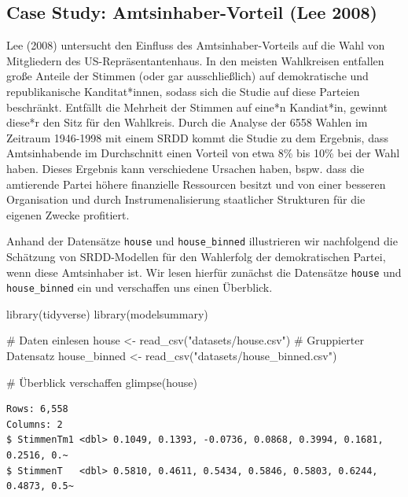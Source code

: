 \documentclass[
  a4paper,
  DIV=11,
  oneside]{scrreprt}
\newenvironment{Shaded}{\begin{snugshade}}{\end{snugshade}}
\newcommand{\CommentTok}[1]{\textcolor[rgb]{0.37,0.37,0.37}{#1}}
\newcommand{\FunctionTok}[1]{\textcolor[rgb]{0.28,0.35,0.67}{#1}}
\newcommand{\NormalTok}[1]{\textcolor[rgb]{0.00,0.23,0.31}{#1}}
\newcommand{\OtherTok}[1]{\textcolor[rgb]{0.00,0.23,0.31}{#1}}
\newcommand{\StringTok}[1]{\textcolor[rgb]{0.13,0.47,0.30}{#1}}
\begin{document}
\subsection{Case Study: Amtsinhaber-Vorteil (Lee
2008)}\label{case-study-amtsinhaber-vorteil-lee2008}

Lee (2008) untersucht den Einfluss des Amtsinhaber-Vorteils auf die Wahl
von Mitgliedern des US-Repräsentantenhaus. In den meisten Wahlkreisen
entfallen große Anteile der Stimmen (oder gar ausschließlich) auf
demokratische und republikanische Kanditat*innen, sodass sich die Studie
auf diese Parteien beschränkt. Entfällt die Mehrheit der Stimmen auf
eine*n Kandiat*in, gewinnt diese*r den Sitz für den Wahlkreis. Durch die
Analyse der 6558 Wahlen im Zeitraum 1946-1998 mit einem SRDD kommt die
Studie zu dem Ergebnis, dass Amtsinhabende im Durchschnitt einen Vorteil
von etwa 8\% bis 10\% bei der Wahl haben. Dieses Ergebnis kann
verschiedene Ursachen haben, bspw. dass die amtierende Partei höhere
finanzielle Ressourcen besitzt und von einer besseren Organisation und
durch Instrumenalisierung staatlicher Strukturen für die eigenen Zwecke
profitiert.

Anhand der Datensätze \texttt{house} und \texttt{house\_binned}
illustrieren wir nachfolgend die Schätzung von SRDD-Modellen für den
Wahlerfolg der demokratischen Partei, wenn diese Amtsinhaber ist. Wir
lesen hierfür zunächst die Datensätze \texttt{house} und
\texttt{house\_binned} ein und verschaffen uns einen Überblick.

\begin{Shaded}
\begin{Highlighting}[]
\FunctionTok{library}\NormalTok{(tidyverse)}
\FunctionTok{library}\NormalTok{(modelsummary)}

\CommentTok{\# Daten einlesen}
\NormalTok{house }\OtherTok{\textless{}{-}} \FunctionTok{read\_csv}\NormalTok{(}\StringTok{"datasets/house.csv"}\NormalTok{)}
\CommentTok{\# Gruppierter Datensatz}
\NormalTok{house\_binned }\OtherTok{\textless{}{-}} \FunctionTok{read\_csv}\NormalTok{(}\StringTok{"datasets/house\_binned.csv"}\NormalTok{)}

\CommentTok{\# Überblick verschaffen}
\FunctionTok{glimpse}\NormalTok{(house)}
\end{Highlighting}
\end{Shaded}

\begin{verbatim}
Rows: 6,558
Columns: 2
$ StimmenTm1 <dbl> 0.1049, 0.1393, -0.0736, 0.0868, 0.3994, 0.1681, 0.2516, 0.~
$ StimmenT   <dbl> 0.5810, 0.4611, 0.5434, 0.5846, 0.5803, 0.6244, 0.4873, 0.5~
\end{verbatim}
\end{document}
